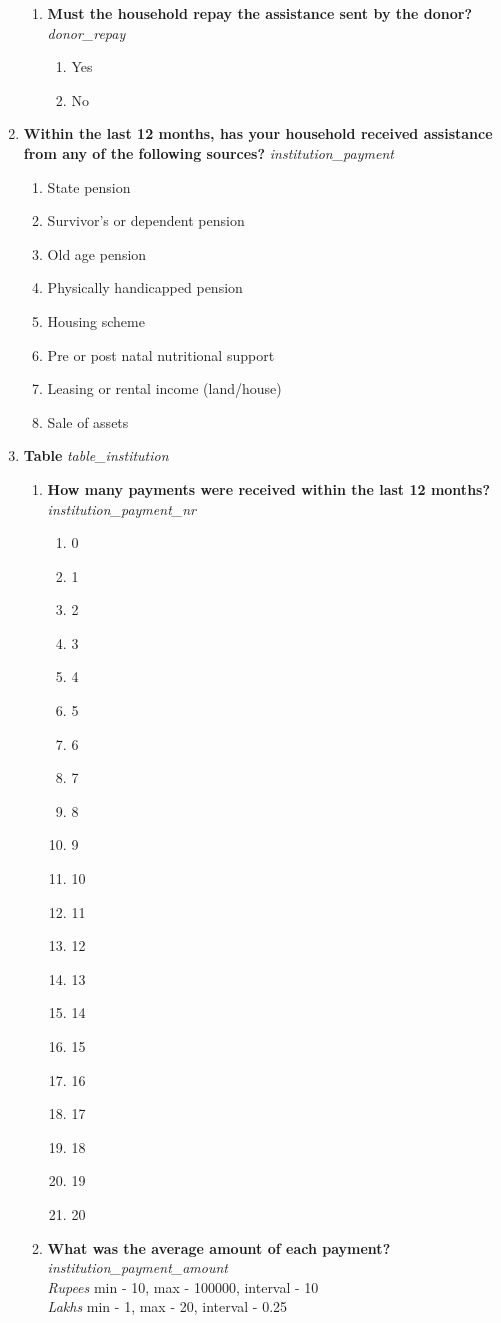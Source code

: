 \documentclass{article}
\begin{document}
\begin{enumerate}
\begin{enumerate}[label*=\arabic*.]
\item {\bfseries Must the household repay the assistance sent by the donor?}\emph{ donor\_repay }
\begin{enumerate}
\item Yes
\item No
\end{enumerate}
\end{enumerate}
\item {\bfseries Within the last 12 months, has your household received assistance from any of the following sources? }\emph{ institution\_payment }
\begin{enumerate}
\item State pension
\item Survivor's or dependent pension
\item Old age pension
\item Physically handicapped pension
\item Housing scheme
\item Pre or post natal nutritional support
\item Leasing or rental income (land/house)
\item Sale of assets
\end{enumerate}
\item {\bfseries Table}\emph{ table\_institution }
\begin{enumerate}[label*=\arabic*.]
\item {\bfseries How many payments were received within the last 12 months?}\emph{ institution\_payment\_nr }
\begin{enumerate}
\item 0
\item 1
\item 2
\item 3
\item 4
\item 5
\item 6
\item 7
\item 8
\item 9
\item 10
\item 11
\item 12
\item 13
\item 14
\item 15
\item 16
\item 17
\item 18
\item 19
\item 20
\end{enumerate}
\item {\bfseries What was the average amount of each payment?}\emph{ institution\_payment\_amount }
\\ \emph{ Rupees }min - 10, max - 100000, interval - 10
\\ \emph{ Lakhs }min - 1, max - 20, interval - 0.25


\end{enumerate}
\end{enumerate}
\end{document}
